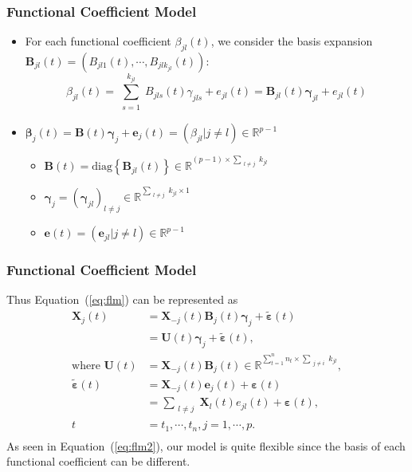 \documentclass{beamer}
\newcommand{\R}{\mathbb R}
\newcommand{\bX}{\mathbf X}
\newcommand{\bB}{\mathbf B}
\newcommand{\bU}{\mathbf U}
\newcommand{\be}{\mathbf e}
\newcommand{\bbeta}{{\boldsymbol{\beta}}}
\newcommand{\bvarepsilon}{\boldsymbol{\varepsilon}}
\newcommand{\bgamma}{\boldsymbol{\gamma}}
\begin{document}

\begin{frame}
	\frametitle{Functional Coefficient Model}
	\begin{itemize}
		\item For each functional coefficient $\beta_{jl}(t)$, we consider the basis expansion $\bB_{jl}(t) = (B_{jl1}(t), \cdots, B_{jlk_{jl}}(t) )$: 
		$$\beta_{jl}(t) = \sum_{\substack{s=1}}^{k_{jl}} B_{jls}(t) \gamma_{jls} + e_{jl}(t) = \bB_{jl}(t) \bgamma_{jl} + e_{jl}(t)$$
		\item $\bbeta_j(t) = \bB(t) \bgamma_j + \be_j(t) = (\beta_{jl}|j \neq l) \in \R^{p-1}$
		\begin{itemize}
			\item $\bB(t) = \text{diag}\left\{\bB_{jl}(t)\right\} \in \R^{(p-1)\times \sum_{\substack{l \neq j}}k_{jl} }$
			\item $\bgamma_j = (\bgamma_{jl})_{l \neq j} \in \R^{\sum_{\substack{l \neq j}}k_{jl} \times 1}$
			\item $\be(t) = (\be_{jl}|j \neq l) \in \R^{p-1}$
		\end{itemize}
	\end{itemize}
	
\end{frame}	

\begin{frame}
	\frametitle{Functional Coefficient Model}
	\pause
	Thus Equation~(\ref{eq:flm}) can be represented as
	\pause
	\begin{equation}
	\label{eq:flm2}
	\begin{aligned}
	\bX_j(t) &= \bX_{-j}(t) \bB_j(t) \bgamma_j + \tilde{\bvarepsilon}(t) \\
	&= \bU(t) \bgamma_j + \tilde{\bvarepsilon}(t),\\
	\text{where } \bU(t) &= \bX_{-j}(t) \bB_j(t)\in \R^{\sum_{t = 1}^{n}n_t \times \sum_{\substack{j \neq i}}k_{jl}},\\
	\tilde{\bvarepsilon}(t) &= \bX_{-j}(t)\be_j(t) + \bvarepsilon(t)\\
	&= \sum_{\substack{l \neq j}} \bX_l(t)e_{jl}(t) + \bvarepsilon(t),\\
	t &= t_1, \cdots, t_n, j = 1, \cdots, p.\\
	\end{aligned}
	\end{equation}
	\pause
	As seen in Equation~(\ref{eq:flm2}), our model is quite flexible since the basis of each functional coefficient can be different.
\end{frame}	
\end{document}
